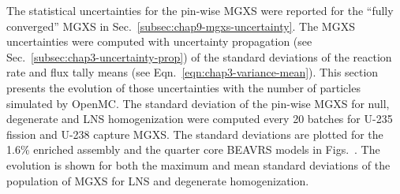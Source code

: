 The statistical uncertainties for the pin-wise \ac{MGXS} were reported for the ``fully converged'' \ac{MGXS} in Sec.~\ref{subsec:chap9-mgxs-uncertainty}. The \ac{MGXS} uncertainties were computed with uncertainty propagation (see Sec.~\ref{subsec:chap3-uncertainty-prop}) of the standard deviations of the reaction rate and flux tally means (see Eqn.~\ref{eqn:chap3-variance-mean}). This section presents the evolution of those uncertainties with the number of particles simulated by OpenMC. The standard deviation of the pin-wise \ac{MGXS} for null, degenerate and \ac{LNS} homogenization were computed every 20 batches for U-235 fission and U-238 capture \ac{MGXS}. The standard deviations are plotted for the 1.6\% enriched assembly and the quarter core \ac{BEAVRS} models in Figs.~. The evolution is shown for both the maximum and mean standard deviations of the population of \ac{MGXS} for \ac{LNS} and degenerate homogenization.

